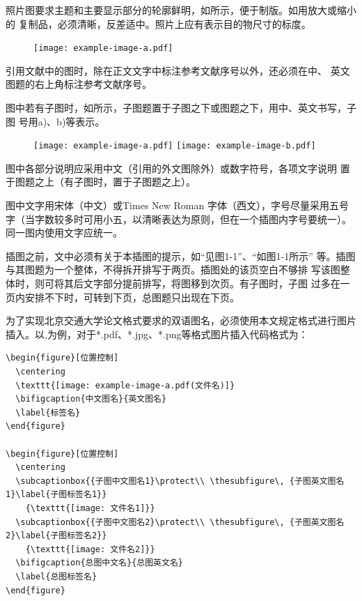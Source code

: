 照片图要求主题和主要显示部分的轮廓鲜明，如所示，便于制版。如用放大或缩小的
复制品，必须清晰，反差适中。照片上应有表示目的物尺寸的标度。

\begin{figure}[htbp]
  \centering
  \texttt{[image: example-image-a.pdf]}
  \label{fig:eg1}
\end{figure}

引用文献中的图\cite{TUN2025LaTeXThesisTe}时，除在正文文字中标注参考文献序号以外，还必须在中、
英文图题的右上角标注参考文献序号。

图中若有子图时，如所示，子图题置于子图之下或图题之下，用中、英文书写，子图
号用a)、b)等表示。

\begin{figure}
  \centering
    {\texttt{[image: example-image-a.pdf]}}
    {\texttt{[image: example-image-b.pdf]}}
  \label{fig:eg2}
\end{figure}

图中各部分说明应采用中文（引用的外文图除外）或数字符号，各项文字说明
置于图题之上（有子图时，置于子图题之上）。

图中文字用宋体（中文）或Times New Roman 字体（西文），字号尽量采用五号字（当字数较多时可用小五，以清晰表达为原则，但在一个插图内字号要统一）。同一图内使用文字应统一。

插图之前，文中必须有关于本插图的提示，如“见图1-1”、“如图1-1所示”
等。插图与其图题为一个整体，不得拆开排写于两页。插图处的该页空白不够排
写该图整体时，则可将其后文字部分提前排写，将图移到次页。有子图时，子图
过多在一页内安排不下时，可转到下页，总图题只出现在下页。

为了实现北京交通大学论文格式要求的双语图名，必须使用本文规定格式进行图片插入。以,为例，对于*.pdf、*.jpg、*.png等格式图片插入代码格式为：

\begin{lstlisting}[language={[LaTeX]TeX}]
\begin{figure}[位置控制]
  \centering
  \texttt{[image: example-image-a.pdf(文件名)]}
  \bifigcaption{中文图名}{英文图名}
  \label{标签名}
\end{figure}

\begin{figure}[位置控制]
  \centering
  \subcaptionbox{{子图中文图名1}\protect\\ \thesubfigure\, {子图英文图名1}\label{子图标签名1}}
    {\texttt{[image: 文件名1]}}
  \subcaptionbox{{子图中文图名2}\protect\\ \thesubfigure\, {子图英文图名2}\label{子图标签名2}}
    {\texttt{[image: 文件名2]}}
  \bifigcaption{总图中文名}{总图英文名}
  \label{总图标签名}
\end{figure}
\end{lstlisting}

